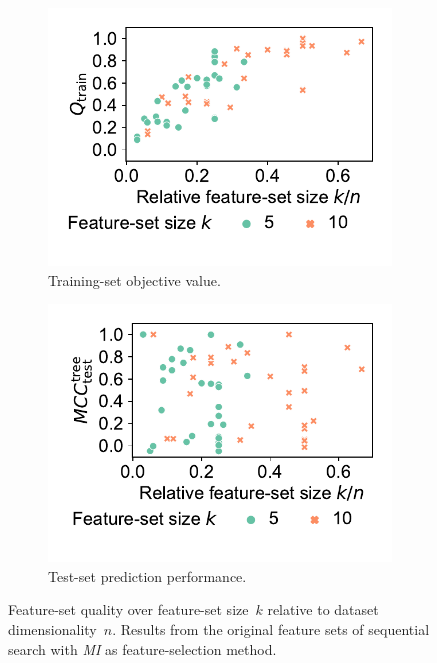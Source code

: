 \documentclass{article}
\theoremstyle{definition}
\begin{document}
\begin{figure}[htb]
	\centering
	\begin{subfigure}[t]{0.48\textwidth}
		\centering
		\includegraphics[width=\textwidth, trim=15 30 15 15, clip]{plots/afs-impact-dataset-k-train-objective.pdf}
		\caption{Training-set objective value.}
		\label{fig:afs:impact-dataset-k-train-objective}
	\end{subfigure}
	\hfill
	\begin{subfigure}[t]{0.48\textwidth}
		\centering
		\includegraphics[width=\textwidth, trim=15 30 15 15, clip]{plots/afs-impact-dataset-k-decision-tree-test-mcc.pdf}
		\caption{Test-set prediction performance.}
		\label{fig:afs:impact-dataset-k-decision-tree-test-mcc}
	\end{subfigure}
	\caption{
		Feature-set quality over feature-set size~$k$ relative to dataset dimensionality~$n$.
		Results from the original feature sets of sequential search with \emph{MI} as feature-selection method.
	}
	\label{fig:afs:impact-dataset-k-quality}
\end{figure}
\end{document}
